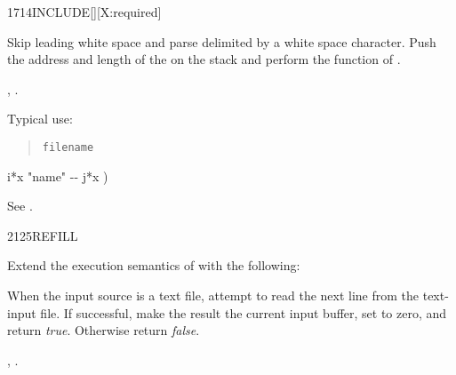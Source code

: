 \begin{worddef}{1714}{INCLUDE}[][X:required]
\item {}

	Skip leading white space and parse  delimited by a
	white space character. Push the address and length of the
	 on the stack and perform the function of
	.

\see {},
	.

	\begin{rationale} %
		Typical use:
		\begin{quote}
			 \texttt{filename}
		\end{quote}
	\end{rationale}

	\begin{implement} %
		\word{:}   i*x "name" -{}- j*x ) \\
		\tab {}  \word{;}
	\end{implement}

	\begin{testing} %
		See .
	\end{testing}
\end{worddef}


\begin{worddef}{2125}{REFILL}
\item {}

	Extend the execution semantics of 
	with the following:

	When the input source is a text file, attempt to read the next
	line from the text-input file. If successful, make the result
	the current input buffer, set  to zero, and
	return \emph{true}. Otherwise return \emph{false}.

\see {},
	.
\end{worddef}


